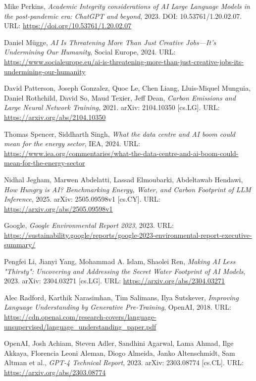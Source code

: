 \begin{thebibliography}{9}

	Mike Perkins,
	\textit{Academic Integrity considerations of AI Large Language Models in the post-pandemic era: ChatGPT and beyond},
	2023. DOI: 10.53761/1.20.02.07. URL: \url{https://doi.org/10.53761/1.20.02.07}

	Daniel Mügge,
	\textit{AI Is Threatening More Than Just Creative Jobs—It's Undermining Our Humanity},
	Social Europe, 2024. URL: \url{https://www.socialeurope.eu/ai-is-threatening-more-than-just-creative-jobs-its-undermining-our-humanity}

	David Patterson, Joseph Gonzalez, Quoc Le, Chen Liang, Lluis-Miquel Munguia, Daniel Rothchild, David So, Maud Texier, Jeff Dean,
	\textit{Carbon Emissions and Large Neural Network Training},
	2021. arXiv: 2104.10350 [cs.LG]. URL: \url{https://arxiv.org/abs/2104.10350}

	Thomas Spencer, Siddharth Singh,
	\textit{What the data centre and AI boom could mean for the energy sector},
	IEA, 2024. URL: \url{https://www.iea.org/commentaries/what-the-data-centre-and-ai-boom-could-mean-for-the-energy-sector}

	Nidhal Jegham, Marwen Abdelatti, Lassad Elmoubarki, Abdeltawab Hendawi,
	\textit{How Hungry is AI? Benchmarking Energy, Water, and Carbon Footprint of LLM Inference},
	2025. arXiv: 2505.09598v1 [cs.CY]. URL: \url{https://arxiv.org/abs/2505.09598v1}

	Google,
	\textit{Google Environmental Report 2023}, 2023. URL:
	\url{https://sustainability.google/reports/google-2023-environmental-report-executive-summary/}

	Pengfei Li, Jianyi Yang, Mohammad A. Islam, Shaolei Ren,
	\textit{Making AI Less "Thirsty": Uncovering and Addressing the Secret Water Footprint of AI Models},
	2023. arXiv: 2304.03271 [cs.LG]. URL: \url{https://arxiv.org/abs/2304.03271}

	Alec Radford, Karthik Narasimhan, Tim Salimans, Ilya Sutskever,
	\textit{Improving Language Understanding by Generative Pre-Training}, OpenAI, 2018. URL:
	\url{https://cdn.openai.com/research-covers/language-unsupervised/language_understanding_paper.pdf}

	OpenAI, Josh Achiam, Steven Adler, Sandhini Agarwal, Lama Ahmad, Ilge Akkaya, Florencia Leoni Aleman, Diogo Almeida, Janko Altenschmidt, Sam Altman et al.,
	\textit{GPT-4 Technical Report},
	2023. arXiv: 2303.08774 [cs.CL]. URL: \url{https://arxiv.org/abs/2303.08774}


\end{thebibliography}
